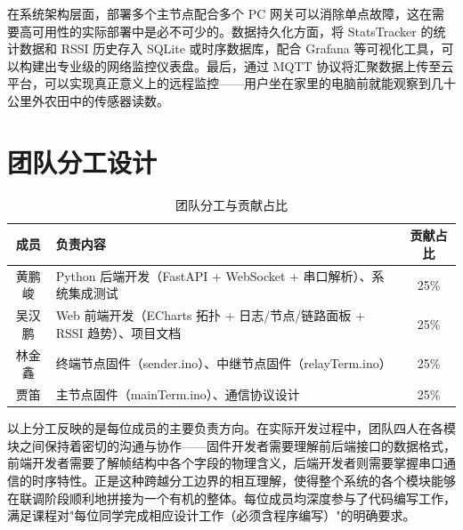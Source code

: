 \documentclass[12pt,a4paper]{ctexart}
\newcommand{\tblheaderstyle}{\sffamily\small\color{white}}
\begin{document}
在系统架构层面，部署多个主节点配合多个 PC 网关可以消除单点故障，这在需要高可用性的实际部署中是必不可少的。数据持久化方面，将 StatsTracker 的统计数据和 RSSI 历史存入 SQLite 或时序数据库，配合 Grafana 等可视化工具，可以构建出专业级的网络监控仪表盘。最后，通过 MQTT 协议将汇聚数据上传至云平台，可以实现真正意义上的远程监控——用户坐在家里的电脑前就能观察到几十公里外农田中的传感器读数。

\section{团队分工设计}
\label{sec:team}

\newpage

\begin{table}[H]
\centering
\caption{团队分工与贡献占比}
\begin{tabularx}{\textwidth}{c >{\raggedright\arraybackslash}X c}
\toprule
\rowcolor{tblhead}\tblheaderstyle 成员 & \tblheaderstyle 负责内容 & \tblheaderstyle 贡献占比 \\
\midrule
黄鹏峻 & Python 后端开发（FastAPI + WebSocket + 串口解析）、系统集成测试 & 25\% \\
吴汉鹏 & Web 前端开发（ECharts 拓扑 + 日志/节点/链路面板 + RSSI 趋势）、项目文档 & 25\% \\
林金鑫 & 终端节点固件（sender.ino）、中继节点固件（relayTerm.ino） & 25\% \\
贾笛   & 主节点固件（mainTerm.ino）、通信协议设计 & 25\% \\
\bottomrule
\end{tabularx}
\end{table}

以上分工反映的是每位成员的主要负责方向。在实际开发过程中，团队四人在各模块之间保持着密切的沟通与协作——固件开发者需要理解前后端接口的数据格式，前端开发者需要了解帧结构中各个字段的物理含义，后端开发者则需要掌握串口通信的时序特性。正是这种跨越分工边界的相互理解，使得整个系统的各个模块能够在联调阶段顺利地拼接为一个有机的整体。每位成员均深度参与了代码编写工作，满足课程对"每位同学完成相应设计工作（必须含程序编写）"的明确要求。
\end{document}
